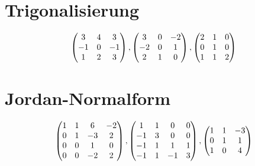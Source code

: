 \documentclass[ngerman,a4paper]{article}
\begin{document}
\section{Trigonalisierung}
\begin{align}
	\begin{pmatrix}
		3 & 4 & 3 \\ -1 & 0 & -1 \\ 1 & 2 & 3
	\end{pmatrix},
	\begin{pmatrix}
		3 & 0 & -2 \\ -2 & 0 & 1 \\ 2 & 1 & 0
	\end{pmatrix},
	\begin{pmatrix}
		2 & 1 & 0 \\ 0 & 1 & 0 \\ 1 & 1 & 2
	\end{pmatrix}\notag
\end{align}

\section{Jordan-Normalform}
\begin{align}
	\begin{pmatrix}
		1 & 1 & 6 & -2 \\ 0 & 1 & -3 & 2 \\ 0 & 0 & 1 & 0 \\ 0 & 0 & -2 & 2
	\end{pmatrix},
	\begin{pmatrix}
		1 & 1 & 0 & 0 \\ -1 & 3 & 0 & 0 \\ -1 & 1 & 1 & 1 \\ -1 & 1 & -1 & 3
	\end{pmatrix},
	\begin{pmatrix}
		1 & 1 & -3 \\ 0 & 1 & 1 \\ 1 & 0 & 4
	\end{pmatrix}\notag
\end{align}
\end{document}
